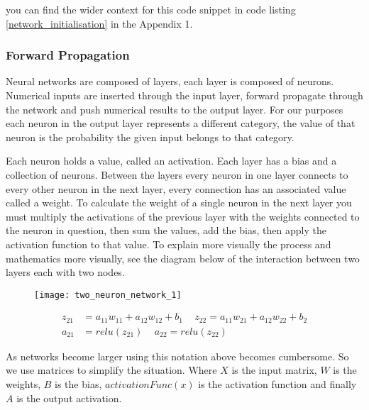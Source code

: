 you can find the wider context for this code snippet in code listing
\ref{network_initialisation} in the Appendix 1.

\subsubsection{Forward Propagation}
Neural networks are composed of layers, each layer is composed of neurons.
Numerical inputs are inserted through the input layer, forward propagate through
the network and push numerical results to the output layer. For our purposes
each neuron in the output layer represents a different category, the value of
that neuron is the probability the given input belongs to that category.

Each neuron holds a value, called an activation. Each layer has a bias and a
collection of neurons. Between the layers every neuron in one layer connects to
every other neuron in the next layer, every connection has an associated value
called a weight. To calculate the weight of a single neuron in the next layer
you must multiply the activations of the previous layer with the weights
connected to the neuron in question, then sum the values, add the bias, then
apply the activation function to that value. To explain more visually the
process and mathematics more visually, see the diagram below of the interaction
between two layers each with two nodes.

\begin{figure}[h]
    \centering
    \texttt{[image: two\_neuron\_network\_1]}
\end{figure}

\begin{equation}
    \begin{aligned}
        z_{21} &= a_{11}w_{11} + a_{12}w_{12} + b_{1} \, \, \, \, \, \, \, z_{22} = a_{11}w_{21} + a_{12}w_{22} + b_{2} \\
        a_{21} &= relu(z_{21}) \, \, \, \, \, \, \, a_{22} = relu(z_{22}) 
    \end{aligned}
\end{equation}


As networks become larger using this notation above becomes cumbersome. So we
use matrices to simplify the situation. Where \(X\) is the input matrix, \(W\)
is the weights, \(B\) is the bias, \(activationFunc(x)\) is the activation function and finally \(A\) is the output activation.

